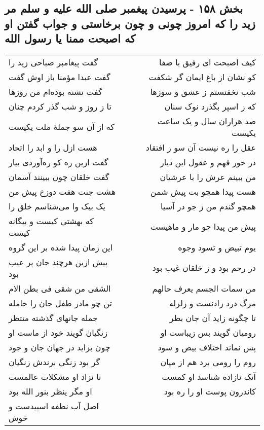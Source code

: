 \begin{center}
\section*{بخش ۱۵۸ - پرسیدن پیغمبر صلی الله علیه و سلم مر زید  را که امروز چونی و چون برخاستی و جواب  گفتن او که اصبحت ممنا یا رسول الله}
\label{sec:sh158}
\begin{longtable}{l p{0.5cm} r}
گفت پیغامبر صباحی زید را
&&
کیف اصبحت ای رفیق با صفا
\\
گفت عبدا مؤمنا باز اوش گفت
&&
کو نشان از باغ ایمان گر شکفت
\\
گفت تشنه بوده‌ام من روزها
&&
شب نخفتستم ز عشق و سوزها
\\
تا ز روز و شب گذر کردم چنان
&&
که ز اسپر بگذرد نوک سنان
\\
که از آن سو جملهٔ ملت یکیست
&&
صد هزاران سال و یک ساعت یکیست
\\
هست ازل را و ابد را اتحاد
&&
عقل را ره نیست آن سو ز افتقاد
\\
گفت ازین ره کو ره‌آوردی بیار
&&
در خور فهم و عقول این دیار
\\
گفت خلقان چون ببینند آسمان
&&
من ببینم عرش را با عرشیان
\\
هشت جنت هفت دوزخ پیش من
&&
هست پیدا همچو بت پیش شمن
\\
یک بیک وا می‌شناسم خلق را
&&
همچو گندم من ز جو در آسیا
\\
که بهشتی کیست و بیگانه کیست
&&
پیش من پیدا چو مار و ماهیست
\\
این زمان پیدا شده بر این گروه
&&
یوم تبیض و تسود وجوه
\\
پیش ازین هرچند جان پر عیب بود
&&
در رحم بود و ز خلقان غیب بود
\\
الشقی من شقی فی بطن الام
&&
من سمات الجسم یعرف حالهم
\\
تن چو مادر طفل جان را حامله
&&
مرگ درد زادنست و زلزله
\\
جمله جانهای گذشته منتظر
&&
تا چگونه زاید آن جان بطر
\\
زنگیان گویند خود از ماست او
&&
رومیان گویند بس زیباست او
\\
چون بزاید در جهان جان و جود
&&
پس نماند اختلاف بیض و سود
\\
گر بود زنگی برندش زنگیان
&&
روم را رومی برد هم از میان
\\
تا نزاد او مشکلات عالمست
&&
آنک نازاده شناسد او کمست
\\
او مگر ینظر بنور الله بود
&&
کاندرون پوست او را ره بود
\\
اصل آب نطفه اسپیدست و خوش
&&

\end{longtable}
\end{center}
